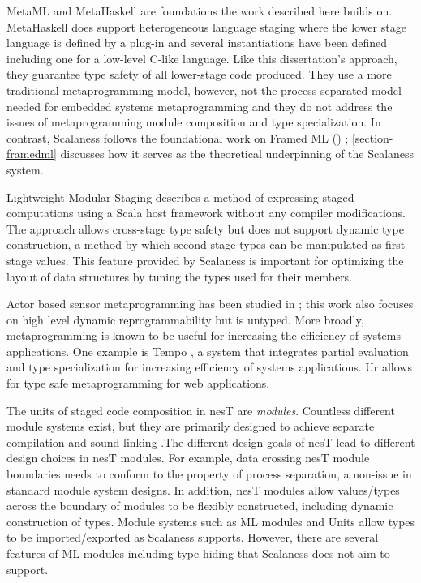 MetaML \cite{Taha-MetaML,DBLP:conf/icess/Taha04} and MetaHaskell \cite{mainland12} are
foundations the work described here builds on. MetaHaskell does support heterogeneous language
staging where the lower stage language is defined by a plug-in and several instantiations have
been defined including one for a low-level C-like language. Like this dissertation's approach,
they guarantee type safety of all lower-stage code produced. They use a more traditional
metaprogramming model, however, not the process-separated model needed for embedded systems
metaprogramming and they do not address the issues of metaprogramming module composition and
type specialization. In contrast, Scalaness follows the foundational work on Framed ML (\fml)
\cite{FramedML}; \autoref{section-framedml} discusses how it serves as the theoretical
underpinning of the Scalaness system.

Lightweight Modular Staging \cite{Rompf-LMS} describes a method of expressing staged
computations using a Scala host framework without any compiler modifications. The approach
allows cross-stage type safety but does not support dynamic type construction, a method by which
second stage types can be manipulated as first stage values. This feature provided by Scalaness
is important for optimizing the layout of data structures by tuning the types used for their
members.

Actor based sensor metaprogramming has been studied in \cite{cheong07}; this work also focuses
on high level dynamic reprogrammability but is untyped. More broadly, metaprogramming is known
to be useful for increasing the efficiency of systems applications. One example is Tempo
\cite{289140}, a system that integrates partial evaluation and type specialization for
increasing efficiency of systems applications. Ur \cite{UrPLDI10} allows for type safe
metaprogramming for web applications.

The units of staged code composition in nesT are \emph{modules}. Countless different module
systems exist, but they are primarily designed to achieve separate compilation and sound linking
\cite{Cardelli-1997}.The different design goals of nesT lead to different design choices in nesT
modules. For example, data crossing nesT module boundaries needs to conform to the property of
process separation, a non-issue in standard module system designs. In addition, nesT modules
allow values/types across the boundary of modules to be flexibly constructed, including dynamic
construction of types. Module systems such as ML modules \cite{macqueen84} and Units
\cite{flatt98units} allow types to be imported/exported as Scalaness supports. However, there
are several features of ML modules including type hiding that Scalaness does not aim to support.

